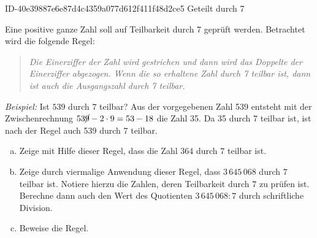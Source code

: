 \begin{exercise}
      {ID-40e39887e6e87d4c4359a077d612f411f48d2ce5}
      {Geteilt durch 7}
  \ifproblem\problem\par
    Eine positive ganze Zahl soll auf Teilbarkeit durch 7 geprüft werden.
    Betrachtet wird die folgende Regel:\par
    \begin{quote}
      \itshape
      Die Einerziffer der Zahl wird gestrichen und dann wird das Doppelte der
      Einerziffer abgezogen. Wenn die so erhaltene Zahl durch 7 teilbar ist,
      dann ist auch die Ausgangszahl durch 7 teilbar.
    \end{quote}
    \textit{Beispiel:} Ist $539$ durch $7$ teilbar? Aus der vorgegebenen Zahl 539
    entsteht mit der Zwischenrechnung $53\cancel9-2\cdot9=53-18$ die Zahl 35.
    Da 35 durch 7 teilbar ist, ist nach der Regel auch 539 durch 7 teilbar.
    \begin{enumerate}[a)]
      \item Zeige mit Hilfe dieser Regel, dass die Zahl $364$ durch $7$ teilbar ist.
      \item Zeige durch viermalige Anwendung dieser Regel, dass $3\,645\,068$ durch
            $7$ teilbar ist. Notiere hierzu die Zahlen, deren Teilbarkeit durch 7
            zu prüfen ist. Berechne dann auch den Wert des Quotienten $3\,645\,068:7$
            durch schriftliche Division.
      \item Beweise die Regel.
    \end{enumerate}
  \fi
\end{exercise}
